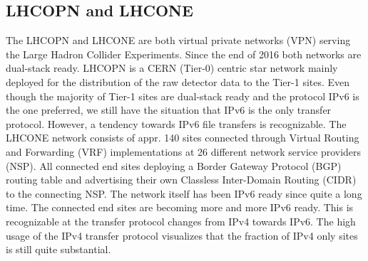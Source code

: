 \subsection{LHCOPN and LHCONE}
The LHCOPN and LHCONE are both virtual private networks (VPN) serving the Large Hadron Collider Experiments. Since the end of 2016 both networks are dual-stack ready. LHCOPN is a CERN (Tier-0) centric star network mainly deployed for the distribution of the raw detector data to the Tier-1 sites. Even though the majority of Tier-1 sites are dual-stack ready and the protocol IPv6 is the one preferred, we still have the situation that IPv6 is the only transfer protocol. However, a tendency towards IPv6 file transfers is  recognizable. The LHCONE network consists of appr. 140 sites connected through Virtual Routing and Forwarding (VRF) implementations at 26 different network service providers (NSP). All connected end sites deploying a Border Gateway Protocol (BGP) routing table and advertising their own Classless Inter-Domain Routing (CIDR) to the connecting NSP. The network itself has been IPv6 ready since quite a long time. The connected end sites are becoming more and more IPv6 ready. This is recognizable at the  transfer protocol changes from IPv4 towards IPv6. The high usage of the IPv4 transfer protocol visualizes that the fraction of IPv4 only sites is still quite substantial.
